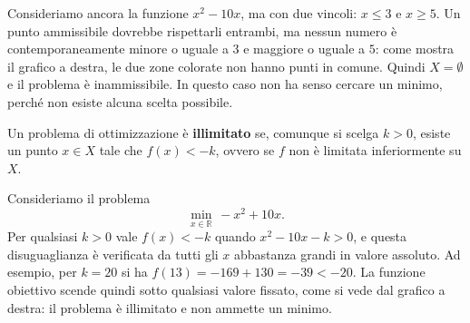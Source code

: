 \begin{esempiofig}
Consideriamo ancora la funzione $x^2 - 10x$, ma con due vincoli: $x \le 3$ e $x \ge 5$. Un punto ammissibile dovrebbe rispettarli entrambi, ma nessun numero è contemporaneamente minore o uguale a $3$ e maggiore o uguale a $5$: come mostra il grafico a destra, le due zone colorate non hanno punti in comune. Quindi $X = \emptyset$ e il problema è inammissibile. In questo caso non ha senso cercare un minimo, perché non esiste alcuna scelta possibile.
\tcblower
{}
\end{esempiofig}

\begin{definizione}
Un problema di ottimizzazione è \textbf{illimitato} se, comunque si scelga $k > 0$, esiste un punto $x \in X$ tale che $f(x) < -k$, ovvero se $f$ non è limitata inferiormente su $X$.
\end{definizione}

\begin{esempiofig}
Consideriamo il problema
\[
\min_{x \in \mathbb{R}} \, -x^2 + 10x.
\]
Per qualsiasi $k > 0$ vale $f(x) < -k$ quando $x^2 - 10x - k > 0$, e questa disuguaglianza è verificata da tutti gli $x$ abbastanza grandi in valore assoluto. Ad esempio, per $k = 20$ si ha $f(13) = -169 + 130 = -39 < -20$. La funzione obiettivo scende quindi sotto qualsiasi valore fissato, come si vede dal grafico a destra: il problema è illimitato e non ammette un minimo.
\tcblower
{}
\end{esempiofig}

